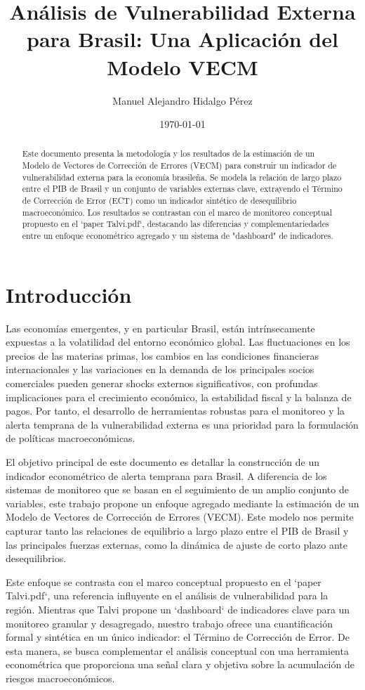 \documentclass[12pt, a4paper]{article}
\title{Análisis de Vulnerabilidad Externa para Brasil: Una Aplicación del Modelo VECM}
\author{Manuel Alejandro Hidalgo Pérez}
\date{\today}
\begin{document}
\maketitle

\begin{abstract}
Este documento presenta la metodología y los resultados de la estimación de un Modelo de Vectores de Corrección de Errores (VECM) para construir un indicador de vulnerabilidad externa para la economía brasileña. Se modela la relación de largo plazo entre el PIB de Brasil y un conjunto de variables externas clave, extrayendo el Término de Corrección de Error (ECT) como un indicador sintético de desequilibrio macroeconómico. Los resultados se contrastan con el marco de monitoreo conceptual propuesto en el `paper Talvi.pdf`, destacando las diferencias y complementariedades entre un enfoque econométrico agregado y un sistema de "dashboard" de indicadores.
\end{abstract}

\section{Introducción}
Las economías emergentes, y en particular Brasil, están intrínsecamente expuestas a la volatilidad del entorno económico global. Las fluctuaciones en los precios de las materias primas, los cambios en las condiciones financieras internacionales y las variaciones en la demanda de los principales socios comerciales pueden generar shocks externos significativos, con profundas implicaciones para el crecimiento económico, la estabilidad fiscal y la balanza de pagos. Por tanto, el desarrollo de herramientas robustas para el monitoreo y la alerta temprana de la vulnerabilidad externa es una prioridad para la formulación de políticas macroeconómicas.

El objetivo principal de este documento es detallar la construcción de un indicador econométrico de alerta temprana para Brasil. A diferencia de los sistemas de monitoreo que se basan en el seguimiento de un amplio conjunto de variables, este trabajo propone un enfoque agregado mediante la estimación de un Modelo de Vectores de Corrección de Errores (VECM). Este modelo nos permite capturar tanto las relaciones de equilibrio a largo plazo entre el PIB de Brasil y las principales fuerzas externas, como la dinámica de ajuste de corto plazo ante desequilibrios.

Este enfoque se contrasta con el marco conceptual propuesto en el `paper Talvi.pdf`, una referencia influyente en el análisis de vulnerabilidad para la región. Mientras que Talvi propone un `dashboard` de indicadores clave para un monitoreo granular y desagregado, nuestro trabajo ofrece una cuantificación formal y sintética en un único indicador: el Término de Corrección de Error. De esta manera, se busca complementar el análisis conceptual con una herramienta econométrica que proporciona una señal clara y objetiva sobre la acumulación de riesgos macroeconómicos.
\end{document}
